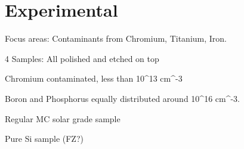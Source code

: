 \section{Experimental}

Focus areas: Contaminants from Chromium, Titanium, Iron.



4 Samples: All polished and etched on top

Chromium contaminated, less than 10^13 cm^-3

Boron and Phosphorus equally distributed around 10^16 cm^-3.

Regular MC solar grade sample

Pure Si sample (FZ?)